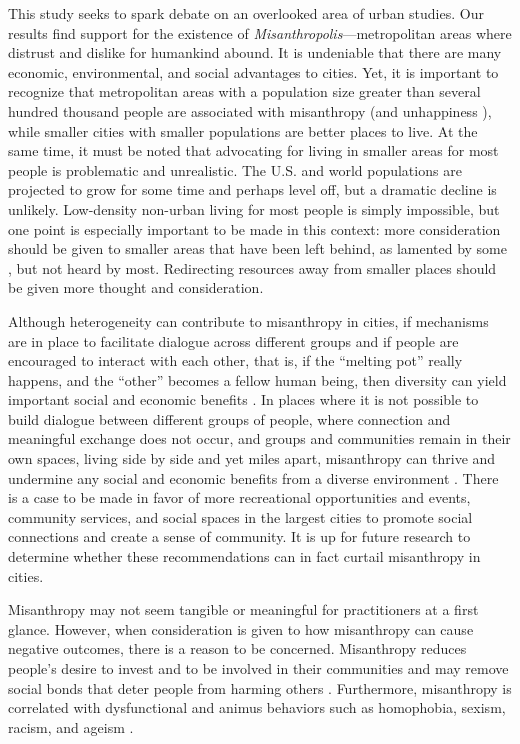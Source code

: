 \documentclass[11pt, letterpaper]{article}
\begin{document}
\begin{spacing}{1.4}
This study seeks to spark debate on an overlooked area of urban studies. %
Our results find  support for the existence of
\emph{Misanthropolis}---metropolitan areas where distrust and dislike for humankind
abound. It is undeniable that there are many economic, environmental, and social
advantages to cities. Yet, it is important to recognize that metropolitan areas
with a population size greater than several hundred thousand people are
associated with misanthropy (and unhappiness \citep{aok-ls_fisher16}), while
smaller cities with smaller populations are better places to live. At the same
time, it must be noted that advocating for living in smaller areas for most people is problematic and unrealistic. The U.S. and world populations are projected to grow for some time and perhaps level off, but a dramatic decline is unlikely. Low-density non-urban living for most people is simply impossible, but one point is especially important to be made in this context: more consideration should be given to smaller areas that have been left behind, as lamented by some \citep[e.g.,][]{fullerNYT17monD,hansonCityJournalautumn15}, but not heard by most. Redirecting resources away from smaller places should be given more thought and consideration.

Although heterogeneity can contribute to misanthropy in cities, if mechanisms
are in place to facilitate dialogue across different groups and if people are
encouraged to interact with each other, that is, if the ``melting pot'' really
happens, and the ``other'' becomes a fellow human being, then diversity can
yield important social and economic benefits \citep{rodriguez2019does}.  In
places where it is not possible to build dialogue between different groups of
people, where connection and meaningful exchange does not occur, and groups and
communities remain in their own spaces, living side by side and yet miles apart,
misanthropy can thrive and undermine any social and economic benefits from a
diverse environment \citep{rodriguez2019does}. There is a case to be made in favor of more recreational opportunities and events, community services, and social spaces in the largest cities to promote social connections and create a sense of community. It is up for future research to determine whether these recommendations can  in fact curtail misanthropy in cities.

Misanthropy may not seem tangible or meaningful for practitioners at a first
glance. However, when consideration is given to how misanthropy can cause
negative outcomes, there is a  reason to be concerned. Misanthropy reduces people's desire to invest and to be involved in their communities and may remove social bonds that deter people from harming others
 \citep{weaver2006,hirschi1993,fafchamps2006,walters2013}. Furthermore, misanthropy is correlated with dysfunctional and animus behaviors such as
 homophobia, sexism, racism, and ageism \citep{cattacin2006}. 
 

\end{spacing}
\end{document}
